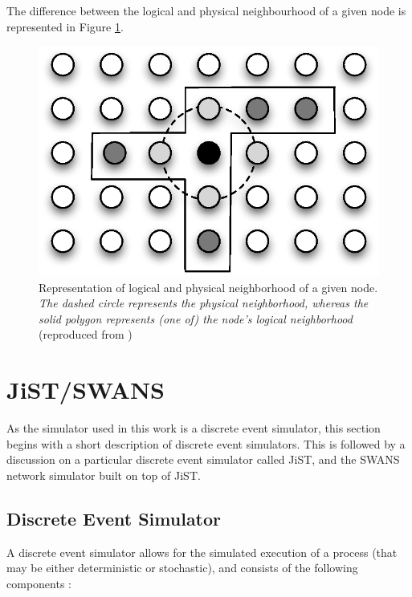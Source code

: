 The difference between the logical and physical neighbourhood of a given node 
is represented in Figure \ref{Fig:LN_physical_vs_logical}.

\begin{figure} 
\centering
\label{Fig:LN_physical_vs_logical}
\includegraphics[scale=0.65]{img/LN_physical_vs_logical.eps} 
\caption[Difference between physical and logical neighborhoods]{Representation 
of logical and physical neighborhood of a given node. \emph{The dashed circle 
represents the physical neighborhood, whereas the solid polygon represents (one 
of) the node's logical neighborhood} (reproduced from
\cite{mottola_LN:2006})}
\end{figure} 

\section {JiST/SWANS}

As the simulator used in this work is a discrete event simulator, this section 
begins with a short description of discrete event simulators. 
This is followed by a discussion on a particular discrete event simulator
called JiST, and the SWANS network simulator built on top of JiST.

\subsection{Discrete Event Simulator}

A discrete event simulator allows for the simulated execution of a process (that
may be either deterministic or stochastic), and consists of the following
components \cite{Shankar_DiscreteEventSim}:

